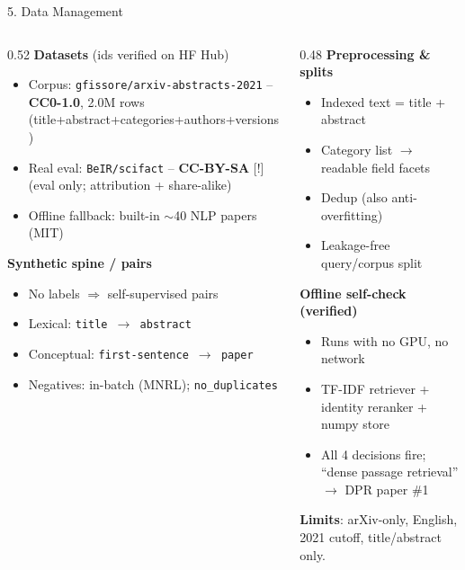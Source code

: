 \documentclass[10pt,aspectratio=169]{beamer}
\begin{document}
\begin{frame}{5. Data Management}
\begin{columns}[T]
\begin{column}{0.52\textwidth}
\textbf{Datasets} (ids verified on HF Hub)
\begin{itemize}\scriptsize
  \item Corpus: \texttt{gfissore/arxiv-abstracts-2021} -- \textbf{CC0-1.0}, 2.0M rows (title+abstract+categories+authors+versions)
  \item Real eval: \texttt{BeIR/scifact} -- \textbf{CC-BY-SA} \textcolor{red!70!black}{[!]} (eval only; attribution + share-alike)
  \item Offline fallback: built-in $\sim$40 NLP papers (MIT)
\end{itemize}

\textbf{Synthetic spine / pairs}
\begin{itemize}\scriptsize
  \item No labels $\Rightarrow$ self-supervised pairs
  \item Lexical: \texttt{title $\rightarrow$ abstract}
  \item Conceptual: \texttt{first-sentence $\rightarrow$ paper}
  \item Negatives: in-batch (MNRL); \texttt{no\_duplicates}
\end{itemize}
\end{column}
\begin{column}{0.48\textwidth}
\textbf{Preprocessing \& splits}
\begin{itemize}\scriptsize
  \item Indexed text = title + abstract
  \item Category list $\rightarrow$ readable field facets
  \item Dedup (also anti-overfitting)
  \item Leakage-free query/corpus split
\end{itemize}

\textbf{Offline self-check (verified)}
\begin{itemize}\scriptsize
  \item Runs with no GPU, no network
  \item TF-IDF retriever + identity reranker + numpy store
  \item All 4 decisions fire; ``dense passage retrieval'' $\rightarrow$ DPR paper \#1
\end{itemize}

\scriptsize \textbf{Limits}: arXiv-only, English, 2021 cutoff, title/abstract only.
\end{column}
\end{columns}
\end{frame}
\end{document}
